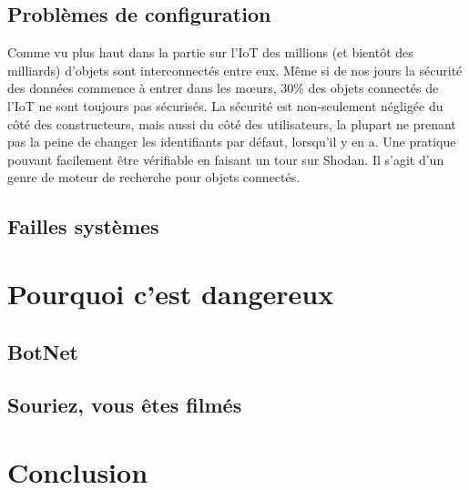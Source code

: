 \documentclass[a4paper]{report}
\begin{document}
	\subsection{Problèmes de configuration}
	Comme vu plus haut dans la partie sur l'IoT des millions (et bientôt des milliards) d'objets sont interconnectés entre eux. Même si
	de nos jours la sécurité des données commence à entrer dans les mœurs, 30\% des objets connectés de l'IoT ne sont toujours pas sécurisés.
	La sécurité est non-seulement négligée du côté des constructeurs, mais aussi du côté des utilisateurs, la plupart ne prenant pas la
	peine de changer les identifiants par défaut, lorsqu'il y en a. Une pratique pouvant facilement être vérifiable en faisant un tour sur 
	Shodan. Il s'agit d'un genre de moteur de recherche pour objets connectés.
	
	\subsection{Failles systèmes}
	
	\section{Pourquoi c'est dangereux}
	\subsection{BotNet}
	\subsection{Souriez, vous êtes filmés}
	
	\section{Conclusion}
\end{document}
